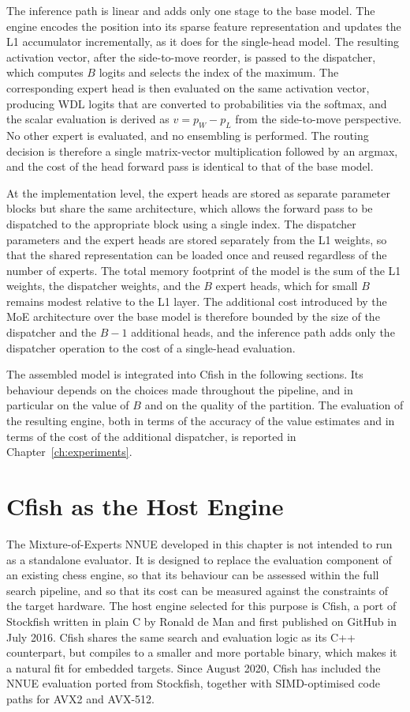The inference path is linear and adds only one stage to the base model. The engine encodes the position into its sparse feature representation and updates the L1 accumulator incrementally, as it does for the single-head model. The resulting activation vector, after the side-to-move reorder, is passed to the dispatcher, which computes \(B\) logits and selects the index of the maximum. The corresponding expert head is then evaluated on the same activation vector, producing WDL logits that are converted to probabilities via the softmax, and the scalar evaluation is derived as \(v = p_W - p_L\) from the side-to-move perspective. No other expert is evaluated, and no ensembling is performed. The routing decision is therefore a single matrix-vector multiplication followed by an argmax, and the cost of the head forward pass is identical to that of the base model.

At the implementation level, the expert heads are stored as separate parameter blocks but share the same architecture, which allows the forward pass to be dispatched to the appropriate block using a single index. The dispatcher parameters and the expert heads are stored separately from the L1 weights, so that the shared representation can be loaded once and reused regardless of the number of experts. The total memory footprint of the model is the sum of the L1 weights, the dispatcher weights, and the \(B\) expert heads, which for small \(B\) remains modest relative to the L1 layer. The additional cost introduced by the MoE architecture over the base model is therefore bounded by the size of the dispatcher and the \(B-1\) additional heads, and the inference path adds only the dispatcher operation to the cost of a single-head evaluation.

The assembled model is integrated into Cfish in the following sections. Its behaviour depends on the choices made throughout the pipeline, and in particular on the value of \(B\) and on the quality of the partition. The evaluation of the resulting engine, both in terms of the accuracy of the value estimates and in terms of the cost of the additional dispatcher, is reported in Chapter~\ref{ch:experiments}.

\section{Cfish as the Host Engine}\label{sec:cfish-host}

The Mixture-of-Experts NNUE developed in this chapter is not intended to run as a standalone evaluator. It is designed to replace the evaluation component of an existing chess engine, so that its behaviour can be assessed within the full search pipeline, and so that its cost can be measured against the constraints of the target hardware. The host engine selected for this purpose is Cfish, a port of Stockfish written in plain C by Ronald de Man and first published on GitHub in July 2016. Cfish shares the same search and evaluation logic as its C++ counterpart, but compiles to a smaller and more portable binary, which makes it a natural fit for embedded targets. Since August 2020, Cfish has included the NNUE evaluation ported from Stockfish, together with SIMD-optimised code paths for AVX2 and AVX-512.

